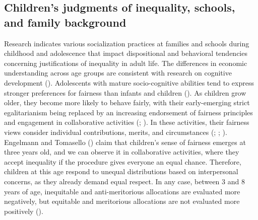 \documentclass[
  letterpaper,
  DIV=11,
  numbers=noendperiod]{scrartcl}
\begin{document}
\subsection{Children's judgments of inequality, schools, and family
background}\label{childrens-judgments-of-inequality-schools-and-family-background}

Research indicates various socialization practices at families and
schools during childhood and adolescence that impact dispositional and
behavioral tendencies concerning justifications of inequality in adult
life. The differences in economic understanding across age groups are
consistent with research on cognitive development
(). Adolescents with mature socio-cognitive abilities tend to
express stronger preferences for fairness than infants and children
(). As children grow
older, they become more likely to behave fairly, with their
early-emerging strict egalitarianism being replaced by an increasing
endorsement of fairness principles and engagement in collaborative
activities (; ). In these activities, their fairness views consider individual
contributions, merits, and circumstances
(;
;
).
Engelmann and Tomasello ()
claim that children's sense of fairness emerges at three years old, and
we can observe it in collaborative activities, where they accept
inequality if the procedure gives everyone an equal chance. Therefore,
children at this age respond to unequal distributions based on
interpersonal concerns, as they already demand equal respect. In any
case, between 3 and 8 years of age, inequitable and anti-meritorious
allocations are evaluated more negatively, but equitable and meritorious
allocations are not evaluated more positively
().
\end{document}
